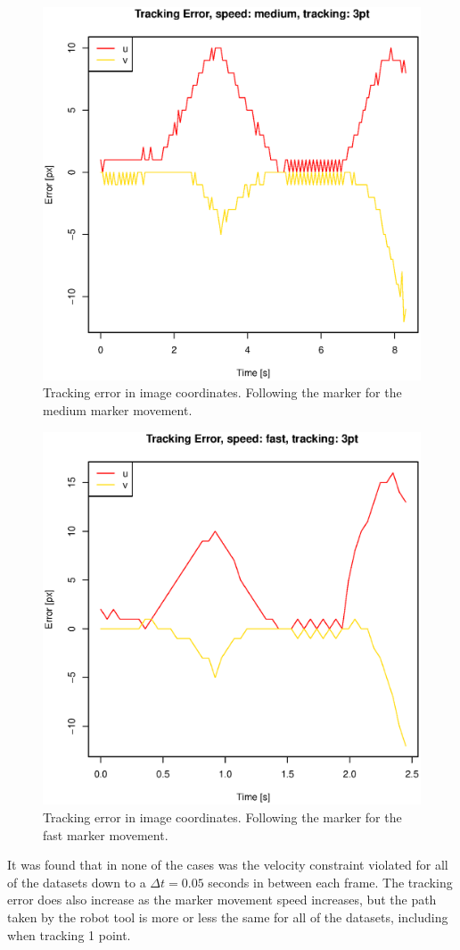 \begin{figure}[H]
\centering
\includegraphics[width= 0.9 \linewidth]{graphics/robotics/trackingError_medium_3pt}
\caption{Tracking error in image coordinates.
Following the marker for the medium marker movement.}
\label{fig:trackingerror_medium_3p}
\end{figure}

\begin{figure}[H]
\centering
\includegraphics[width= 0.9 \linewidth]{graphics/robotics/trackingError_fast_3pt}
\caption{Tracking error in image coordinates.
Following the marker for the fast marker movement.}
\label{fig:trackingerror_fast_3p}
\end{figure}

It was found that in none of the cases was the velocity constraint violated for all of the datasets down to a $\Delta t = 0.05$ seconds in between each frame.
The tracking error does also increase as the marker movement speed increases, but the path taken by the robot tool is more or less the same for all of the datasets, including when tracking 1 point.
